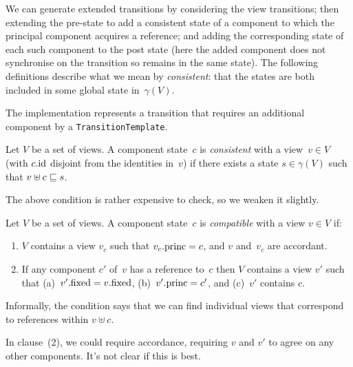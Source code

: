 We can generate extended transitions by considering the view transitions; then
extending the pre-state to add a consistent state of a component to which the
principal component acquires a reference; and adding the corresponding state
of each such component to the post state (here the added component does not
synchronise on the transition so remains in the same state).  The following
definitions describe what we mean by \emph{consistent}: that the states are
both included in some global state in~$\gamma(V)$.

\begin{impNote}
The implementation represents a transition that requires an
  additional component by a \texttt{TransitionTemplate}.
\end{impNote}

\begin{definition}
Let $V$ be a set of views.  A component state~$c$ is \emph{consistent} with a
view~$v \in V$ (with $c.\mathrm{id}$ disjoint from the identities in~$v$) if there
exists a state $s \in \gamma(V)$ such that $v \uplus c \sqsubseteq s$.
\end{definition}
%
The above condition is rather expensive to check, so we weaken it slightly. 
%
\begin{definition}
\label{def:compatible}
Let $V$ be a set of views.  A component state~$c$ is \emph{compatible} with a
view $v \in V$ if:
%
\begin{enumerate}
\item\label{item:compatible-1} $V$ contains a view $v_c$ such that $v_c.\mathrm{princ}
  = c$, and $v$ and~$v_c$ are accordant.


\item\label{item:compatible-2} If any component $c'$ of~$v$ has a reference
  to~$c$ then $V$ contains a view $v'$ such that (a)~$v'.\mathrm{fixed} = v.\mathrm{fixed}$,
  (b)~$v'.\mathrm{princ} = c'$, and (c)~$v'$ contains $c$.
\end{enumerate}
\end{definition}
%
Informally, the condition says that we can find individual views that
correspond to references within $v \uplus c$.

\begin{improve}
In clause~(2), we could require accordance, requiring $v$ and $v'$ to agree on
any other components.  It's not clear if this is best. 
\end{improve}

